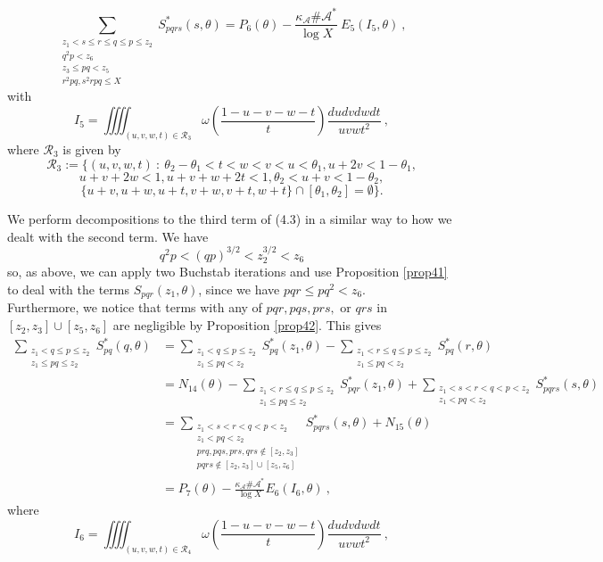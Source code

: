 \documentclass{amsart}
\numberwithin{equation}{subsection}
\begin{document}
$$\sum_{\substack{z_1<s\leq r\leq q\leq p\leq z_2 \\ q^2p<z_6 \\ z_3\leq pq<  z_5 \\ r^2pq, s^2rpq\leq X}} S_{pqrs}^*(s, \theta)=P_6(\theta)-\frac{\kappa_{\mathcal{A}}\#\mathcal{A}^*}{\log X}\: E_5(I_5, \theta)\:,$$
with 
\[
I_5=\iiiint_{(u,v,w,t)\in \mathcal{R}_3} \omega\left(\frac{1-u-v-w-t}{t}\right)\frac{dudvdwdt}{uvwt^2}\:, \tag{4.10}
\]
where $\mathcal{R}_3$ is given by
$$\mathcal{R}_3:=\{(u,v,w,t)\::\: \theta_2-\theta_1<t<w<v<u<\theta_1, 
u+2v<1-\theta_1,$$
$$ u+v+2w<1, u+v+w+2t<1, \theta_2<u+v<1-\theta_2,$$
$$\{ u+v, u+w, u+t, v+w, v+t, w+t\}\cap[\theta_1, \theta_2]=\emptyset \}. $$

We perform decompositions to the third term of (4.3) in a similar way to how we dealt with the second term. We have 
$$q^2p<(qp)^{3/2}<z_2^{3/2}<z_6$$
so, as above, we can apply two Buchstab iterations and use Proposition \ref{prop41} to deal with the terms $S_{pqr}(z_1, \theta)$, since we have $pqr\leq pq^2<z_6$.\\
Furthermore, we notice that terms with any of $pqr, pqs, prs,$ or $qrs$ in $[z_2, z_3]\cup [z_5, z_6]$ are negligible by Proposition \ref{prop42}. This gives 
\begin{align*}
\sum_{\substack{z_1<q\leq p\leq z_2 \\ z_1\leq pq\leq z_2}} S_{pq}^*(q, \theta)&=  \sum_{\substack{z_1<q\leq p\leq z_2 \\ z_1\leq pq< z_2}} S_{pq}^*(z_1, \theta)-\sum_{\substack{z_1<r\leq q\leq p\leq z_2 \\ z_1\leq pq< z_2}} S_{pq}^*(r, \theta)\\
&=N_{14}(\theta)-\sum_{\substack{z_1<r\leq q\leq p\leq z_2 \\ z_1\leq pq\leq z_2}} S_{pqr}^*(z_1, \theta)+\sum_{\substack{z_1<s<r<q< p< z_2 \\ z_1< pq< z_2}} S_{pqrs}^*(s, \theta)\\
&=\sum_{\substack{z_1<s<r<q< p< z_2 \\ z_1< pq< z_2 \\ prq, pqs, prs, qrs\not\in[z_2, z_3]\\ pqrs\not\in[z_2, z_3]\cup[z_5, z_6]}} S_{pqrs}^*(s, \theta)+N_{15}(\theta)\\
&=P_7(\theta)-\frac{\kappa_{\mathcal{A}}\#\mathcal{A}^*}{\log X} E_6(I_6, \theta)\:,
\end{align*}
where
\[
I_6=\iiiint_{(u,v,w,t)\in\mathcal{R}_4} \omega\left(\frac{1-u-v-w-t}{t}\right)\frac{dudvdwdt}{uvwt^2}\:,\tag{4.11}
\]
\end{document}
